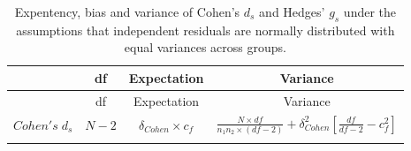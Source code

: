 \documentclass[
  english,
  man,floatsintext]{apa6}
\begin{document}
\newpage
\begin{landscape}

\begin{longtable}[]{@{}lccc@{}}
\caption{Expentency, bias and variance of Cohen's \(d_s\) and Hedges' \(g_s\) under the assumptions that independent residuals are normally distributed with equal variances across groups.}\tabularnewline
\toprule
\begin{minipage}[b]{0.12\columnwidth}\raggedright
\strut
\end{minipage} & \begin{minipage}[b]{0.11\columnwidth}\centering
df\strut
\end{minipage} & \begin{minipage}[b]{0.24\columnwidth}\centering
Expectation\strut
\end{minipage} & \begin{minipage}[b]{0.42\columnwidth}\centering
Variance\strut
\end{minipage}\tabularnewline
\midrule
\endfirsthead
\toprule
\begin{minipage}[b]{0.12\columnwidth}\raggedright
\strut
\end{minipage} & \begin{minipage}[b]{0.11\columnwidth}\centering
df\strut
\end{minipage} & \begin{minipage}[b]{0.24\columnwidth}\centering
Expectation\strut
\end{minipage} & \begin{minipage}[b]{0.42\columnwidth}\centering
Variance\strut
\end{minipage}\tabularnewline
\midrule
\endhead
\begin{minipage}[t]{0.12\columnwidth}\raggedright
\(Cohen's \; d_s\)\strut
\end{minipage} & \begin{minipage}[t]{0.11\columnwidth}\centering
\(N-2\)\strut
\end{minipage} & \begin{minipage}[t]{0.24\columnwidth}\centering
\(\delta_{Cohen} \times c_f\)\strut
\end{minipage} & \begin{minipage}[t]{0.42\columnwidth}\centering
\(\frac{N\times df}{n_1n_2 \times (df-2)} + \delta^2_{Cohen} \left[ \frac{df}{df-2} - c_f^2\right]\)\strut
\end{minipage}\tabularnewline
\begin{minipage}[t]{0.12\columnwidth}\raggedright
\strut

\end{minipage}
\end{longtable}
\end{landscape}
\end{document}

